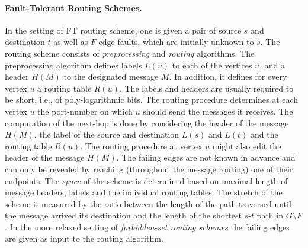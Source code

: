 \paragraph{Fault-Tolerant Routing Schemes.} In the setting of FT routing scheme, one is given a pair of source $s$ and destination $t$ as well as $F$ edge faults, which are initially unknown to $s$. The routing scheme consists of \emph{preprocessing} and \emph{routing} algorithms. The preprocessing algorithm defines labels $L(u)$ to each of the vertices $u$, and a header $H(M)$ to the designated message $M$. In addition, it defines for every vertex $u$ a routing table $R(u)$. The labels and headers are usually required to be short, i.e., of poly-logarithmic bits. 
The routing procedure determines at each vertex $u$ the port-number on which $u$ should send the messages it receives. The computation of the next-hop is done by considering the header of the message $H(M)$, the label of the source and destination $L(s)$ and $L(t)$ and the routing table $R(u)$. The routing procedure at vertex $u$ might also edit the header of the message $H(M)$. The failing edges are not known in advance and can only be revealed by reaching (throughout the message routing) one of their endpoints. The \emph{space} of the scheme is determined based on maximal length of message headers, labels and the individual routing tables. The stretch of the scheme is measured by the ratio between the length of the path traversed until the message arrived its destination and the length of the shortest $s$-$t$ path in $G \setminus F$. In the more relaxed setting of \emph{forbidden-set routing schemes} the failing edges are given as input to the routing algorithm.

